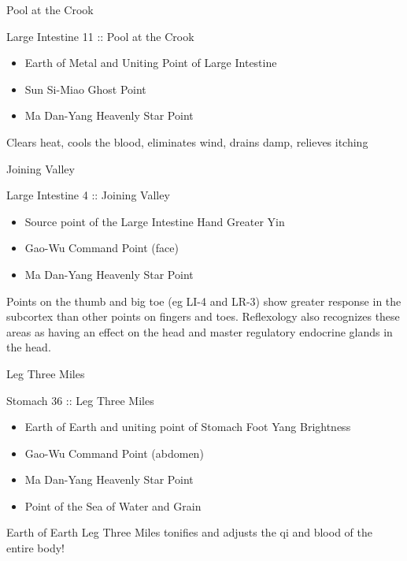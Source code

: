 \begin{frame}{Pool at the Crook}

\large{Large Intestine 11 :: Pool at the Crook}

\begin{itemize}
\item Earth of Metal and Uniting Point of Large Intestine
\item Sun Si-Miao Ghost Point
\item Ma Dan-Yang Heavenly Star Point
\end{itemize}

\vspace{1em}

Clears heat, cools the blood, eliminates wind, drains damp, relieves itching

\end{frame}

\begin{frame}{Joining Valley}

\large{Large Intestine 4 :: Joining Valley}

\begin{itemize}
\item Source point of the Large Intestine Hand Greater Yin
\item Gao-Wu Command Point (face)
\item Ma Dan-Yang Heavenly Star Point
\end{itemize}

\vspace{1em}

Points on the thumb and big toe (eg LI-4 and LR-3) show greater response in the subcortex than other points on fingers and toes. Reflexology also recognizes these areas as having an effect on the head and master regulatory endocrine glands in the head. 

\end{frame}


\begin{frame}{Leg Three Miles}

\large{Stomach 36 :: Leg Three Miles}

\begin{itemize}
\item Earth of Earth and uniting point of Stomach Foot Yang Brightness
\item Gao-Wu Command Point (abdomen)
\item Ma Dan-Yang Heavenly Star Point
\item Point of the Sea of Water and Grain
\end{itemize}

\vspace{1em}

Earth of Earth Leg Three Miles tonifies and adjusts the qi and blood of the entire body!

\end{frame}

